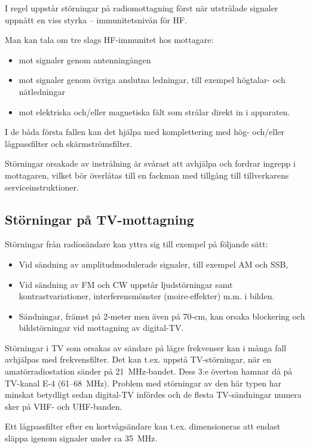 I regel uppstår störningar på radiomottagning först när utstrålade signaler
uppnått en viss styrka -- immunitetsnivån för HF.

Man kan tala om tre slags HF-immunitet hos mottagare:
\begin{itemize}
\item mot signaler genom antenningången
\item mot signaler genom övriga anslutna ledningar, till exempel högtalar-
  och nätledningar
\item mot elektriska och/eller magnetiska fält som strålar direkt in i
  apparaten.
\end{itemize}

I de båda första fallen kan det hjälpa med komplettering med hög- och/eller
lågpassfilter och skärmströmsfilter.

Störningar orsakade av instrålning är svårast att avhjälpa och fordrar ingrepp i
mottagaren, vilket bör överlåtas till en fackman med tillgång till
tillverkarens serviceinstruktioner.

\subsection{Störningar på TV-mottagning}

Störningar från radiosändare kan yttra sig till exempel på följande sätt:
\begin{itemize}
  uppstår ljudförvrängning i ljudkanalen samt ränder m.m. i bilden,
\item Vid sändning av amplitudmodulerade signaler, till exempel AM och SSB,
\item Vid sändning av FM och CW uppstår ljudstörningar samt
  kontrastvariationer, interferensmönster (moire-effekter) m.m. i bilden.
\item Sändningar, främst på 2-meter men även på 70-cm, kan orsaka blockering och
  bildstörningar vid mottagning av digital-TV.
\end{itemize}

Störningar i TV som orsakas av sändare på lägre frekvenser kan i många fall
avhjälpas med frekvensfilter.
Det kan t.ex. uppstå TV-störningar, när en amatörradiostation sänder på
21~MHz-bandet.
Dess 3:e överton hamnar då på TV-kanal E-4 (61--68~MHz).
Problem med störningar av den här typen har minskat betydligt sedan digital-TV
infördes och de flesta TV-sändningar numera sker på VHF- och UHF-banden.

Ett lågpassfilter efter en kortvågsändare kan t.ex. dimensioneras att endast
släppa igenom signaler under ca 35~MHz.

